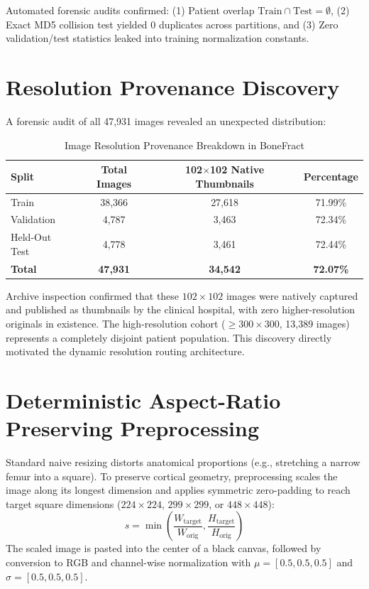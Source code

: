 \documentclass[12pt, a4paper]{report}
\begin{document}
Automated forensic audits confirmed: (1) Patient overlap $\text{Train} \cap \text{Test} = \emptyset$, (2) Exact MD5 collision test yielded 0 duplicates across partitions, and (3) Zero validation/test statistics leaked into training normalization constants.

\section{Resolution Provenance Discovery}
A forensic audit of all 47,931 images revealed an unexpected distribution:
\begin{table}[H]
\centering
\caption{Image Resolution Provenance Breakdown in BoneFract}
\label{tab:provenance}
\begin{tabular}{lccc}
\toprule
\textbf{Split} & \textbf{Total Images} & \textbf{102$\times$102 Native Thumbnails} & \textbf{Percentage} \\
\midrule
Train & 38,366 & 27,618 & 71.99\% \\
Validation & 4,787 & 3,463 & 72.34\% \\
Held-Out Test & 4,778 & 3,461 & 72.44\% \\
\midrule
\textbf{Total} & \textbf{47,931} & \textbf{34,542} & \textbf{72.07\%} \\
\bottomrule
\end{tabular}
\end{table}

Archive inspection confirmed that these $102\times 102$ images were natively captured and published as thumbnails by the clinical hospital, with zero higher-resolution originals in existence. The high-resolution cohort ($\ge 300\times 300$, 13,389 images) represents a completely disjoint patient population. This discovery directly motivated the dynamic resolution routing architecture.

\section{Deterministic Aspect-Ratio Preserving Preprocessing}
Standard naive resizing distorts anatomical proportions (e.g., stretching a narrow femur into a square). To preserve cortical geometry, preprocessing scales the image along its longest dimension and applies symmetric zero-padding to reach target square dimensions ($224\times 224$, $299\times 299$, or $448\times 448$):
\begin{equation}
    s = \min\left( \frac{W_{\text{target}}}{W_{\text{orig}}}, \frac{H_{\text{target}}}{H_{\text{orig}}} \right)
\end{equation}
The scaled image is pasted into the center of a black canvas, followed by conversion to RGB and channel-wise normalization with $\mu = [0.5, 0.5, 0.5]$ and $\sigma = [0.5, 0.5, 0.5]$.
\end{document}
